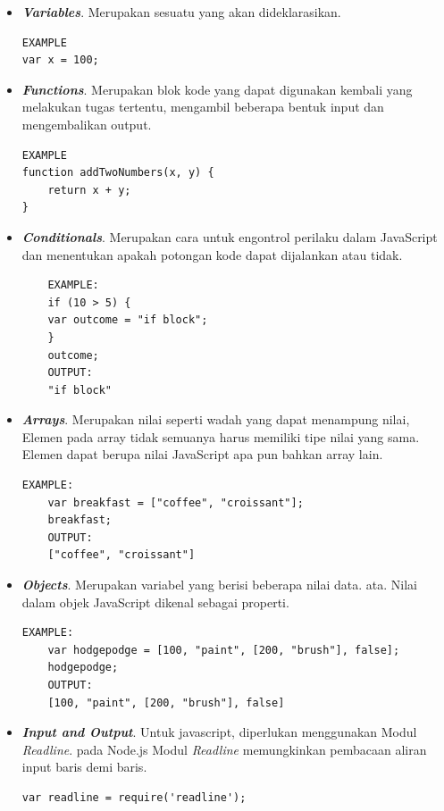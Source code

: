 \documentclass[a4paper,twoside]{article}
\begin{document}
\begin{enumerate}
\begin{itemize}
		    \item \textbf{\textit{Variables}}. Merupakan sesuatu yang akan dideklarasikan.
		    \begin{verbatim}
EXAMPLE
var x = 100;		        
		    \end{verbatim}
		    \vspace{-5mm}
		    \item \textbf{\textit{Functions}}. Merupakan  blok kode yang dapat digunakan kembali yang melakukan tugas tertentu, mengambil beberapa bentuk input dan mengembalikan output.
		    \begin{verbatim}
EXAMPLE
function addTwoNumbers(x, y) {
    return x + y;
}		        
		    \end{verbatim}
		    \vspace{-5mm}
		    \item \textbf{\textit{Conditionals}}. Merupakan cara untuk engontrol perilaku dalam JavaScript dan menentukan apakah potongan kode dapat dijalankan atau tidak.
		    \begin{verbatim}
    EXAMPLE:
    if (10 > 5) {
    var outcome = "if block";
    }
    outcome;
    OUTPUT:
    "if block"		        
		    \end{verbatim}
		    \vspace{-2mm}		    
		    \item \textbf{\textit{Arrays}}. Merupakan nilai seperti wadah yang dapat menampung nilai, Elemen pada array tidak semuanya harus memiliki tipe nilai yang sama. Elemen dapat berupa nilai JavaScript apa pun bahkan array lain.
		    \begin{verbatim}
EXAMPLE:
    var breakfast = ["coffee", "croissant"];
    breakfast;
    OUTPUT:
    ["coffee", "croissant"]			        
		    \end{verbatim}
		    \vspace{-2mm}
	    
		    \item \textbf{\textit{Objects}}. Merupakan variabel yang berisi beberapa nilai data. ata. Nilai dalam objek JavaScript dikenal sebagai properti. 
		    \begin{verbatim}
EXAMPLE:
    var hodgepodge = [100, "paint", [200, "brush"], false];
    hodgepodge;
    OUTPUT:
    [100, "paint", [200, "brush"], false]		        
		    \end{verbatim}
		    \vspace{-2mm}
		    
		    \item \textbf{\textit{Input and Output}}. Untuk javascript, diperlukan menggunakan Modul \textit{Readline}. pada Node.js Modul \textit{Readline} memungkinkan pembacaan aliran input baris demi baris.
		    \begin{verbatim}
var readline = require('readline');
		    \end{verbatim}
		    \vspace{-2mm}
		    

\end{itemize}
\end{enumerate}
\end{document}

